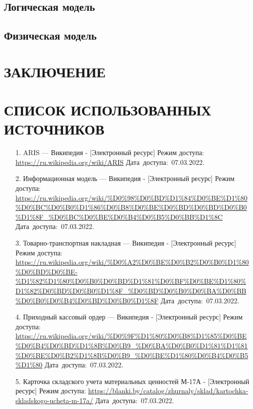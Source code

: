 \documentclass[12pt, a4paper, simple]{eskdtext}
\begin{document}
    \subsection{Логическая модель}
    \subsection{Физическая модель}
    \newpage

    \newpage
    \section*{ЗАКЛЮЧЕНИЕ}
    \newpage

    \newpage
    \section*{СПИСОК ИСПОЛЬЗОВАННЫХ ИСТОЧНИКОВ}
    \begin{enumerate}    
        \item[1.] ARIS — Википедия
        - [Электронный ресурс]
        Режим доступа: \url{https://ru.wikipedia.org/wiki/ARIS}
        Дата~доступа:~07.03.2022.
        \item[2.] Информационная модель — Википедия
        - [Электронный ресурс]
        Режим доступа: \url{https://ru.wikipedia.org/wiki/%D0%98%D0%BD%D1%84%D0%BE%D1%80%D0%BC%D0%B0%D1%86%D0%B8%D0%BE%D0%BD%D0%BD%D0%B0%D1%8F_%D0%BC%D0%BE%D0%B4%D0%B5%D0%BB%D1%8C}
        Дата~доступа:~07.03.2022.
        \item[3.] Товарно-транспортная накладная — Википедия
        - [Электронный ресурс]
        Режим доступа: \url{https://ru.wikipedia.org/wiki/%D0%A2%D0%BE%D0%B2%D0%B0%D1%80%D0%BD%D0%BE-%D1%82%D1%80%D0%B0%D0%BD%D1%81%D0%BF%D0%BE%D1%80%D1%82%D0%BD%D0%B0%D1%8F_%D0%BD%D0%B0%D0%BA%D0%BB%D0%B0%D0%B4%D0%BD%D0%B0%D1%8F}
        Дата~доступа:~07.03.2022.
        \item[4.] Приходный кассовый ордер — Википедия
        - [Электронный ресурс]
        Режим доступа: \url{https://ru.wikipedia.org/wiki/%D0%9F%D1%80%D0%B8%D1%85%D0%BE%D0%B4%D0%BD%D1%8B%D0%B9_%D0%BA%D0%B0%D1%81%D1%81%D0%BE%D0%B2%D1%8B%D0%B9_%D0%BE%D1%80%D0%B4%D0%B5%D1%80}
        Дата~доступа:~07.03.2022.
        \item[5.] Карточка складского учета материальных ценностей М-17А 
        - [Электронный ресурс]
        Режим доступа: \url{https://blanki.by/catalog/zhurnaly/sklad/kartochka-skladskogo-ucheta-m-17a/}
        Дата~доступа:~07.03.2022.
    \end{enumerate}
    \newpage
\end{document}
